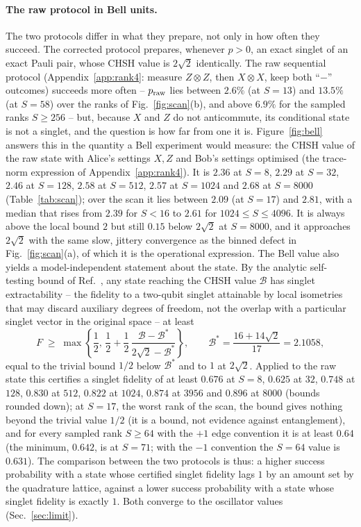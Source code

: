 \documentclass[11pt,a4paper]{article}
\begin{document}
\paragraph{The raw protocol in Bell units.}
The two protocols differ in what they prepare, not only in how often they succeed. The corrected protocol prepares, whenever $p>0$, an exact singlet of an exact Pauli pair, whose CHSH value is $2\sqrt2$ identically. The raw sequential protocol (Appendix~\ref{app:rank4}: measure $Z\otimes Z$, then $X\otimes X$, keep both ``$-$'' outcomes) succeeds more often -- $p_{\rm raw}$ lies between $2.6\%$ (at $S=13$) and $13.5\%$ (at $S=58$) over the ranks of Fig.~\ref{fig:scan}(b), and above $6.9\%$ for the sampled ranks $S\ge256$ -- but, because $X$ and $Z$ do not anticommute, its conditional state is not a singlet, and the question is how far from one it is. Figure~\ref{fig:bell} answers this in the quantity a Bell experiment would measure: the CHSH value of the raw state with Alice's settings $X,Z$ and Bob's settings optimised (the trace-norm expression of Appendix~\ref{app:rank4}). It is $2.36$ at $S=8$, $2.29$ at $S=32$, $2.46$ at $S=128$, $2.58$ at $S=512$, $2.57$ at $S=1024$ and $2.68$ at $S=8000$ (Table~\ref{tab:scan}); over the scan it lies between $2.09$ (at $S=17$) and $2.81$, with a median that rises from $2.39$ for $S<16$ to $2.61$ for $1024\le S\le4096$. It is always above the local bound $2$ but still $0.15$ below $2\sqrt2$ at $S=8000$, and it approaches $2\sqrt2$ with the same slow, jittery convergence as the binned defect in Fig.~\ref{fig:scan}(a), of which it is the operational expression. The Bell value also yields a model-independent statement about the state. By the analytic self-testing bound of Ref.~\cite{Kaniewski2016}, any state reaching the CHSH value $\mathcal B$ has singlet extractability -- the fidelity to a two-qubit singlet attainable by local isometries that may discard auxiliary degrees of freedom, not the overlap with a particular singlet vector in the original space -- at least
\begin{equation}
F\;\ge\;\max\!\left\{\frac12,\,\frac12+\frac12\,\frac{\mathcal B-\mathcal B^*}{2\sqrt2-\mathcal B^*}\right\},\qquad \mathcal B^*=\frac{16+14\sqrt2}{17}=2.1058,
\label{eq:selftest}
\end{equation}
equal to the trivial bound $1/2$ below $\mathcal B^*$ and to $1$ at $2\sqrt2$. Applied to the raw state this certifies a singlet fidelity of at least $0.676$ at $S=8$, $0.625$ at $32$, $0.748$ at $128$, $0.830$ at $512$, $0.822$ at $1024$, $0.874$ at $3956$ and $0.896$ at $8000$ (bounds rounded down); at $S=17$, the worst rank of the scan, the bound gives nothing beyond the trivial value $1/2$ (it is a bound, not evidence against entanglement), and for every sampled rank $S\ge64$ with the $+1$ edge convention it is at least $0.64$ (the minimum, $0.642$, is at $S=71$; with the $-1$ convention the $S=64$ value is $0.631$). The comparison between the two protocols is thus: a higher success probability with a state whose certified singlet fidelity lags $1$ by an amount set by the quadrature lattice, against a lower success probability with a state whose singlet fidelity is exactly $1$. Both converge to the oscillator values (Sec.~\ref{sec:limit}).
\end{document}
